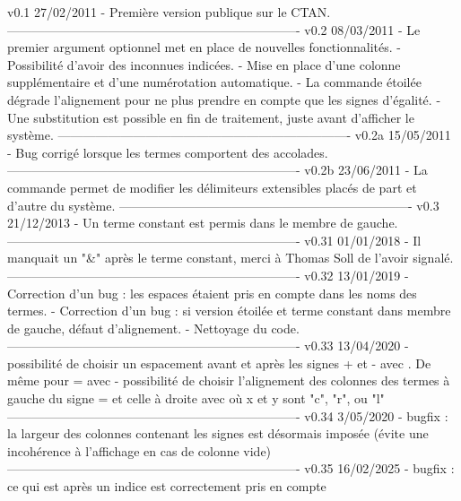 v0.1        27/02/2011
    - Première version publique sur le CTAN.
----------------------------------------------------------------------
v0.2        08/03/2011
    - Le premier argument optionnel met en place de nouvelles
      fonctionnalités.
    - Possibilité d'avoir des inconnues indicées.
    - Mise en place d'une colonne supplémentaire et d'une
      numérotation automatique.
    - La commande étoilée \systeme* dégrade l'alignement pour ne
      plus prendre en compte que les signes d'égalité.
    - Une substitution est possible en fin de traitement, juste
      avant d'afficher le système.
----------------------------------------------------------------------
v0.2a       15/05/2011
    - Bug corrigé lorsque les termes comportent des accolades.
----------------------------------------------------------------------
v0.2b       23/06/2011
    - La commande \setdelim permet de modifier les délimiteurs
      extensibles placés de part et d'autre du système.
----------------------------------------------------------------------
v0.3        21/12/2013
    - Un terme constant est permis dans le membre de gauche.
----------------------------------------------------------------------
v0.31       01/01/2018
    - Il manquait un "&" après le terme constant, merci à Thomas Soll
      de l'avoir signalé.
----------------------------------------------------------------------
v0.32       13/01/2019
    - Correction d'un bug : les espaces étaient pris en compte dans
      les noms des termes.
    - Correction d'un bug : si version étoilée et terme constant dans
      membre de gauche, défaut d'alignement.
    - Nettoyage du code.
----------------------------------------------------------------------
v0.33       13/04/2020
    - possibilité de choisir un espacement avant et après les signes
      + et - avec . De même pour = avec
    - possibilité de choisir l'alignement des colonnes des termes à
      gauche du signe = et celle à droite avec  où
      x et y sont "c", "r", ou "l"
----------------------------------------------------------------------
v0.34       3/05/2020
    - bugfix : la largeur des colonnes contenant les signes est
      désormais imposée (évite une incohérence à l'affichage en cas
      de colonne vide)
----------------------------------------------------------------------
v0.35       16/02/2025
    - bugfix : ce qui est après un indice est correctement pris en
      compte